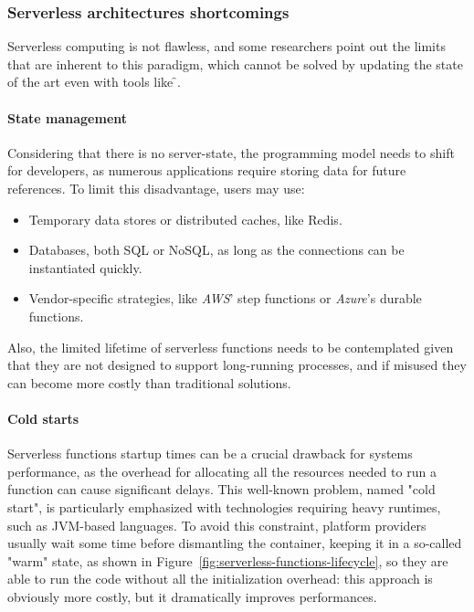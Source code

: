 \subsubsection{Serverless architectures shortcomings}

Serverless computing is not flawless, and some researchers \cite{two-steps-back}
point out the limits that are inherent to this paradigm, which cannot be solved
by updating the state of the art even with tools like \f{}.

\paragraph{\textbf{State management}} Considering that there is no server-state,
the programming model needs to shift for developers, as numerous applications require
storing data for future references.
To limit this disadvantage, users may use:
\begin{itemize}
  \item Temporary data stores or distributed caches, like Redis.
  \item Databases, both SQL or NoSQL, as long as the connections can be instantiated quickly.
  \item Vendor-specific strategies, like \textit{AWS}' step functions or \textit{Azure}'s durable functions.
\end{itemize}
Also, the limited lifetime of serverless functions needs to be contemplated given that
they are not designed to support long-running processes,
and if misused they can become more costly than traditional solutions.

\paragraph{\textbf{Cold starts}} Serverless functions startup times
can be a crucial drawback for systems performance, as the overhead for
allocating all the resources needed to run a function can cause significant
delays. This well-known problem, named "cold start", is
particularly emphasized with technologies requiring heavy runtimes, such as JVM-based languages.
To avoid this constraint, platform providers usually wait some time
before dismantling the container, keeping it in a so-called "warm" state, as shown in Figure~\ref{fig:serverless-functions-lifecycle},
so they are able to run the code without all the initialization overhead:
this approach is obviously more costly, but it dramatically improves performances.

